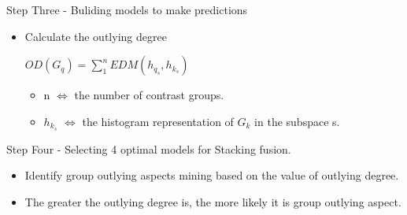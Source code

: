 \documentclass[
size=14pt,
paper=smartboard,  %
mode=present, 		%
display=slides, 	%
style=tuliplab,  	%
pauseslide,
fleqn,leqno]{powerdot}
\begin{document}
\begin{slide}{Step Three - Buliding models to make predictions}
	
	\begin{itemize}
		\item
		Calculate the outlying degree
		
		\vspace{1.2cm}
		
		\begin{centering}
			
			$ OD(G_q) = \sum_{1}^{n}EDM(h_{q_s}, h_{k_s}) $
			
		\end{centering}
		
		\begin{itemize}
			\item
			n $\Leftrightarrow$ the number of contrast groups.
			
			\item
			$h_{k_s}$  $\Leftrightarrow$ the histogram representation of $G_k$ in the subspace s.
			
		\end{itemize}
	\end{itemize}
	
\end{slide}


\begin{slide}{Step Four - Selecting 4 optimal models for Stacking fusion.}
	\begin{itemize}
		\item
		Identify group outlying aspects mining based on the value
		of outlying degree.
		
		\item
		The greater the outlying degree is,
		the more likely it is group outlying aspect.
	\end{itemize}
	
\end{slide}
\end{document}
